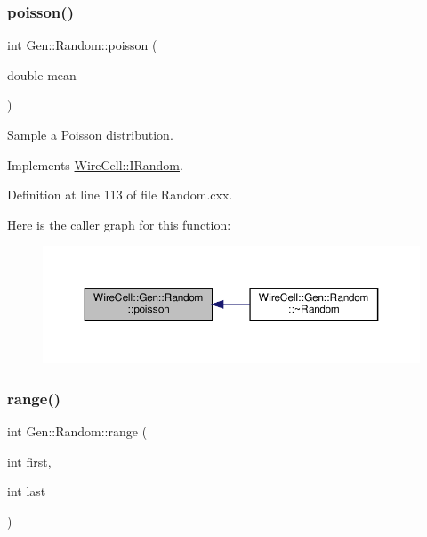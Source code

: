 \subsubsection{\texorpdfstring{poisson()}{poisson()}}
{\footnotesize\ttfamily int Gen\+::\+Random\+::poisson (\begin{DoxyParamCaption}\item[{double}]{mean }\end{DoxyParamCaption})\hspace{0.3cm}{\ttfamily [virtual]}}



Sample a Poisson distribution. 



Implements \hyperlink{class_wire_cell_1_1_i_random_aae935a94e7a72eccaaf9ad7f1a2fd76a}{Wire\+Cell\+::\+I\+Random}.



Definition at line 113 of file Random.\+cxx.

Here is the caller graph for this function\+:
\nopagebreak
\begin{figure}[H]
\begin{center}
\leavevmode
\includegraphics[width=350pt]{class_wire_cell_1_1_gen_1_1_random_abf2ad8cda2e34f349f073a148dd5ac58_icgraph}
\end{center}
\end{figure}
\mbox{\label{class_wire_cell_1_1_gen_1_1_random_a84b86a3aaa791e75eb3eb80e1efb1d7e}} 
\subsubsection{\texorpdfstring{range()}{range()}}
{\footnotesize\ttfamily int Gen\+::\+Random\+::range (\begin{DoxyParamCaption}\item[{int}]{first,  }\item[{int}]{last }\end{DoxyParamCaption})\hspace{0.3cm}{\ttfamily [virtual]}}



